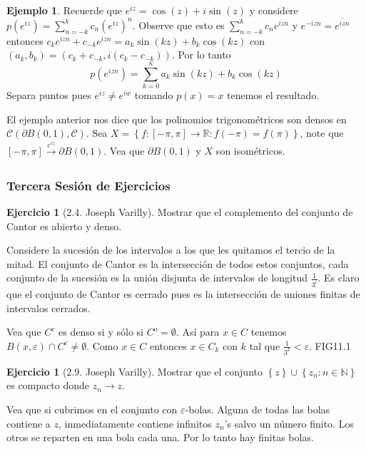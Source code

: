 \documentclass[12pt]{article}
\theoremstyle{plain}
\theoremstyle{definition}
\newtheorem{Ex}[Th]{Ejemplo}               %
\newtheorem{Ej}[Th]{Ejercicio}
\theoremstyle{remark}
\numberwithin{equation}{section}
\newcommand{\bN}{\mathbb{N}}        %
\newcommand{\bR}{\mathbb{R}}        %
\newcommand{\cC}{\mathcal{C}}       %
\renewcommand{\:}{\colon}           %
\newcommand{\conj}[1]{\left\lbrace#1\right\rbrace}
\newcommand{\bonj}[1]{\left\lbrack#1\right\rbrack}
\begin{document}
\begin{multicols}{2}
\begin{ptcbp}
 \end{ptcbp}

 \begin{Ex}
   Recuerde que $e^{iz}=\cos(z)+i\sin(z)$ y considere $p(e^{iz})=\sum_{n=-k}^{k}c_n(e^{iz})^n$. Observe que esto es $\sum_{n=-k}^{k}c_ne^{izn}$ y $e^{-izn}=\overline{e^{izn}}$ entonces
   $c_ke^{izn}+c_{-k}e^{izn}=a_k\sin(kz)+b_k\cos(kz)$ con $(a_k,b_k)=(c_k+c_{-k},i(c_k-c_{-k}))$. Por lo tanto
   $$p(e^{izn})=\sum_{k=0}^{n}a_k\sin(kz)+b_k\cos(kz)$$
   Separa puntos pues $e^{iz}\neq e^{iw}$ tomando $p(x)=x$ tenemos el resultado.
 \end{Ex}

 El ejemplo anterior nos dice que los polinomios trigonométricos son densos en $\cC(\partial B(0,1),\cC)$. Sea $X=\conj{f\colon\bonj{-\pi,\pi}\to\bR\colon f(-\pi)=f(\pi)}$, note que $\bonj{-\pi,\pi}\xrightarrow[]{e^{iz}}\partial B(0,1)$. Vea que $\partial B(0,1)$ y $X$ son isométricos.

 \subsubsection*{Tercera Sesión de Ejercicios}

 \begin{Ej}[2.4. Joseph Varilly]
   Mostrar que el complemento del conjunto de Cantor es abierto y denso.
 \end{Ej}

 \begin{ptcb}
 Considere la sucesión de los intervalos a los que les quitamos el tercio de la mitad. El conjunto de Cantor es la intersección de todos estos conjuntos, cada conjunto de la sucesión es la unión disjunta de intervalos de longitud $\frac{1}{3^i}$. Es claro que el conjunto de Cantor es cerrado pues es la intersección de uniones finitas de intervalos cerrados. \par
 Vea que $C^c$ es denso si y sólo si $C^o=\emptyset$. Así para $x\in C$ tenemos $B(x,\varepsilon)\cap C^c\neq\emptyset$. Como $x\in C$ entonces $x\in C_k$ con $k$ tal que $\frac{1}{3^k}<\varepsilon$. FIG11.1
 \end{ptcb}

 \begin{Ej}[2.9. Joseph Varilly]
   Mostrar que el conjunto $\conj{z}\cup\conj{z_n\colon n\in\bN}$ es compacto donde $z_n\to z$.
 \end{Ej}

 \begin{ptcb}
Vea que si cubrimos en el conjunto con $\varepsilon$-bolas. Alguna de todas las bolas contiene a $z$, inmediatamente contiene infinitos $z_n$'s salvo un número finito. Los otros se reparten en una bola cada una. Por lo tanto hay finitas bolas.
 \end{ptcb}


\end{multicols}
\end{document}
